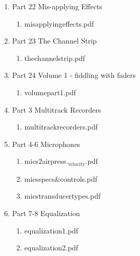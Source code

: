 \documentclass[11pt]{article}
\begin{document}
\begin{enumerate}
\begin{enumerate}
\item Part 22 Mis-applying Effects
\label{sec-1-1-1-1-49-1-5-5-11}
\begin{enumerate}
\item misapplyingeffects.pdf
\label{sec-1-1-1-1-49-1-5-5-11-1}
\end{enumerate}

\item Part 23 The Channel Strip
\label{sec-1-1-1-1-49-1-5-5-12}
\begin{enumerate}
\item thechannelstrip.pdf
\label{sec-1-1-1-1-49-1-5-5-12-1}
\end{enumerate}

\item Part 24 Volume 1 - fiddling with faders
\label{sec-1-1-1-1-49-1-5-5-13}
\begin{enumerate}
\item volumepart1.pdf
\label{sec-1-1-1-1-49-1-5-5-13-1}
\end{enumerate}

\item Part 3 Multitrack Recorders
\label{sec-1-1-1-1-49-1-5-5-14}
\begin{enumerate}
\item multitrackrecorders.pdf
\label{sec-1-1-1-1-49-1-5-5-14-1}
\end{enumerate}

\item Part 4-6 Microphones
\label{sec-1-1-1-1-49-1-5-5-15}
\begin{enumerate}
\item mics2airpress.$_{\text{velocity}}$.pdf
\label{sec-1-1-1-1-49-1-5-5-15-1}

\item micsspecs\&controls.pdf
\label{sec-1-1-1-1-49-1-5-5-15-2}

\item micstransducertypes.pdf
\label{sec-1-1-1-1-49-1-5-5-15-3}
\end{enumerate}

\item Part 7-8 Equalization
\label{sec-1-1-1-1-49-1-5-5-16}
\begin{enumerate}
\item equalization1.pdf
\label{sec-1-1-1-1-49-1-5-5-16-1}

\item equalization2.pdf
\label{sec-1-1-1-1-49-1-5-5-16-2}
\end{enumerate}


\end{enumerate}
\end{enumerate}
\end{document}
